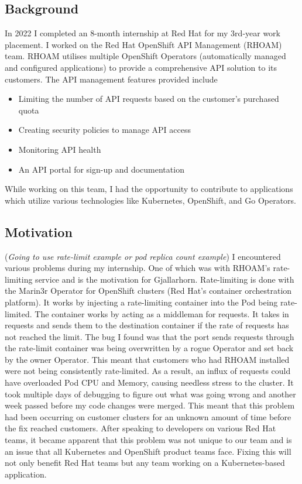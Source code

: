 \documentclass{article}
\begin{document}
\subsection{Background}
In 2022 I completed an 8-month internship at Red Hat for my 3rd-year work placement. I worked on the Red Hat OpenShift API Management (RHOAM) team. RHOAM utilises multiple OpenShift Operators (automatically managed and configured applications) to provide a comprehensive API solution to its customers. The API management features provided include
\begin{itemize}
    \itemsep0em 
    \item Limiting the number of API requests based on the customer’s purchased quota
    \item Creating security policies to manage API access
    \item Monitoring API health
    \item An API portal for sign-up and documentation
\end{itemize}

While working on this team, I had the opportunity to contribute to applications which utilize various technologies like Kubernetes, OpenShift, and Go Operators.

\subsection{Motivation} 
(\emph{Going to use rate-limit example or pod replica count example})
I encountered various problems during my internship. One of which was with RHOAM’s rate-limiting service and is the motivation for Gjallarhorn. Rate-limiting is done with the Marin3r Operator for OpenShift clusters (Red Hat’s container orchestration platform). It works by injecting a rate-limiting container into the Pod being rate-limited. The container works by acting as a middleman for requests. It takes in requests and sends them to the destination container if the rate of requests has not reached the limit. The bug I found was that the port sends requests through the rate-limit container was being overwritten by a rogue Operator and set back by the owner Operator. This meant that customers who had RHOAM installed were not being consistently rate-limited. As a result, an influx of requests could have overloaded Pod CPU and Memory, causing needless stress to the cluster. It took multiple days of debugging to figure out what was going wrong and another week passed before my code changes were merged. This meant that this problem had been occurring on customer clusters for an unknown amount of time before the fix reached customers. After speaking to developers on various Red Hat teams, it became apparent that this problem was not unique to our team and is an issue that all Kubernetes and OpenShift product teams face. Fixing this will not only benefit Red Hat teams but any team working on a Kubernetes-based application.
\end{document}
